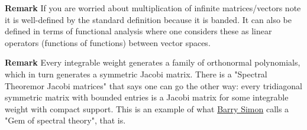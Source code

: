 \textbf{Remark} If you are worried about multiplication of infinite matrices/vectors note it is well-defined by the standard definition because it is banded. It can also be defined in terms of functional analysis where one considers these as linear operators (functions of functions) between vector spaces.

\textbf{Remark} Every integrable weight generates a family of orthonormal polynomials, which in turn generates a symmetric Jacobi matrix. There is a "Spectral Theoremor Jacobi matrices" that says one can go the other way: every tridiagonal symmetric matrix with bounded entries is a Jacobi matrix for some integrable weight with compact support. This is an example of what \href{https://en.wikipedia.org/wiki/Barry_Simon}{Barry Simon} calls a "Gem of spectral theory", that is.

